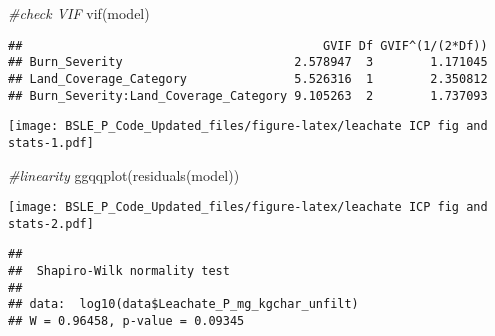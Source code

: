 \documentclass[
]{article}
\newenvironment{Shaded}{\begin{snugshade}}{\end{snugshade}}
\newcommand{\CommentTok}[1]{\textcolor[rgb]{0.56,0.35,0.01}{\textit{#1}}}
\newcommand{\DecValTok}[1]{\textcolor[rgb]{0.00,0.00,0.81}{#1}}
\newcommand{\FunctionTok}[1]{\textcolor[rgb]{0.00,0.00,0.00}{#1}}
\newcommand{\NormalTok}[1]{#1}
\newcommand{\SpecialCharTok}[1]{\textcolor[rgb]{0.00,0.00,0.00}{#1}}
\begin{document}
\begin{Shaded}
\begin{Highlighting}[]
\CommentTok{\#check VIF}
\FunctionTok{vif}\NormalTok{(model)}
\end{Highlighting}
\end{Shaded}

\begin{verbatim}
##                                          GVIF Df GVIF^(1/(2*Df))
## Burn_Severity                        2.578947  3        1.171045
## Land_Coverage_Category               5.526316  1        2.350812
## Burn_Severity:Land_Coverage_Category 9.105263  2        1.737093
\end{verbatim}

\begin{Shaded}
\end{Shaded}

\texttt{[image: BSLE\_P\_Code\_Updated\_files/figure-latex/leachate ICP fig and stats-1.pdf]}

\begin{Shaded}
\begin{Highlighting}[]
\CommentTok{\#linearity}
\FunctionTok{ggqqplot}\NormalTok{(}\FunctionTok{residuals}\NormalTok{(model))}
\end{Highlighting}
\end{Shaded}

\texttt{[image: BSLE\_P\_Code\_Updated\_files/figure-latex/leachate ICP fig and stats-2.pdf]}

\begin{Shaded}
\end{Shaded}

\begin{verbatim}
## 
##  Shapiro-Wilk normality test
## 
## data:  log10(data$Leachate_P_mg_kgchar_unfilt)
## W = 0.96458, p-value = 0.09345
\end{verbatim}
\end{document}
